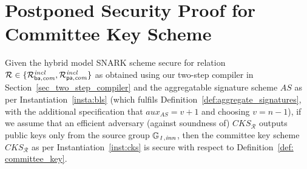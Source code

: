 \section{Postponed Security Proof for Committee Key Scheme}
\label{supplementary_proof_sec_cks}

\begin{theorem} Given the hybrid model SNARK scheme secure for relation $\mathcal{R} \in \{ \mathcal{R}^{\mathit{incl}}_{\mathsf{ba},\mathit{com}}, \mathcal{R}^{\mathit{incl}}_{\mathsf{pa},\mathit{com}}\}$ as 
obtained using our two-step compiler in Section~\ref{sec_two_step_compiler} and the aggregatable signature scheme $\mathit{AS}$ 
                     as per Instantiation~\ref{insta:bls} (which fulfils Definition~\ref{def:aggregate_signatures}, with the additional 
                     specification that $\mathit{aux}_{\mathit{AS}} = v+1$ and choosing $v = n-1$), 
if we assume that an efficient adversary (against soundness of) $\mathit{CKS}_{\mathcal{R}}$ outputs public keys only from the source group 
$\mathbb{G}_{\mathit{1,inn}}$, then the committee key scheme $\mathit{CKS}_{\mathcal{R}}$ as per Instantiation~\ref{inst:cks} is secure with respect to Definition~\ref{def: committee_key}. 
\end{theorem}

